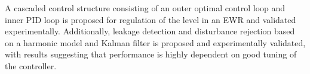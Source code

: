 A cascaded control structure consisting of an outer optimal control loop and inner PID loop is proposed for regulation of the level in an EWR and validated experimentally. Additionally, leakage detection and disturbance rejection based on a harmonic model and Kalman filter is proposed and experimentally validated, with results suggesting that performance is highly dependent on good tuning of the controller.